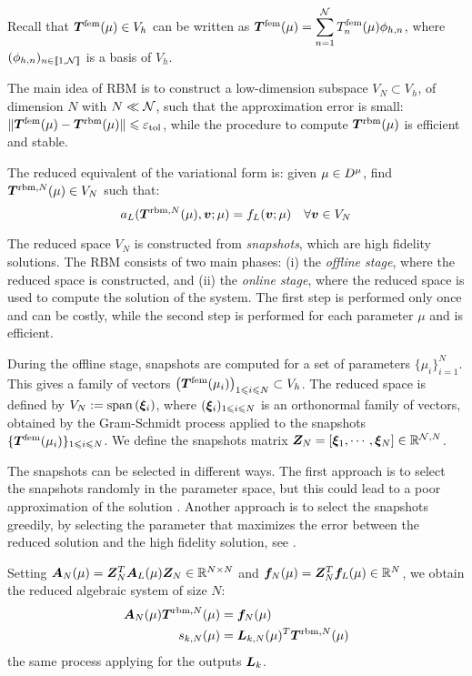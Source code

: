 Recall that $\vct{T}^\fem(\mu)\in V_h$ can be written as $\vct{T}^\fem(\mu)=\displaystyle\sum_{n=1}^\N T^\fem_n(\mu)\phi_{h,n}$, where $(\phi_{h,n})_{n\in\llbracket 1,\mathcal{N}\rrbracket}$ is a basis of $V_h$.

The main idea of RBM is to construct a low-dimension subspace $V_N\subset V_h$, of dimension $N$ with $N\ll \mathcal{N}$, such that the approximation error is small:
$\Vert \vct{T}^\fem(\mu) - \vct{T}^\rbm(\mu)\Vert \leqslant \varepsilon_\tol$, while the procedure to compute $\vct{T}^\rbm(\mu)$ is efficient and stable.

The reduced equivalent of the variational form  is:
given $\mu\in D^{\mu}$, find $\vct{T}^{\rbm, N}(\mu)\in V_N$ such that:
\begin{equation}
    a_L(\vct{T}^{\rbm, N}(\mu), \vct{v}; \mu) = f_L(\vct{v}; \mu) \quad \forall \vct{v}\in V_N
    \label{eq:pb-var-rbm-reduced}
\end{equation}


The reduced space $V_N$ is constructed from \emph{snapshots}, which are high fidelity solutions.
The RBM consists of two main phases:
(i) the \emph{offline stage}, where the reduced space is constructed, and
(ii) the \emph{online stage}, where the reduced space is used to compute the solution of the system.
The first step is performed only once and can be costly, while the second step is performed for each parameter $\mu$ and is efficient.

During the offline stage, snapshots are computed for a set of parameters $\{\mu_i\}_{i=1}^N$.
This gives a family of vectors $\big(\vct{T}^\fem(\mu_i)\big)_{1\leqslant i\leqslant N}\subset V_h$.
The reduced space is defined by $V_N := \text{span}\left(\vct{\xi}_i\right)$, where $(\vct{\xi}_i)_{1\leqslant i\leqslant N}$ is an orthonormal family of vectors, obtained by the Gram-Schmidt process applied to the snapshots $\{\vct{T}^\fem(\mu_i)\}_{1\leqslant i\leqslant N}$.
We define the snapshots matrix $\mat{Z}_N = \left[\vct{\xi}_1,\cdots,\vct{\xi}_N\right]\in \R^{\N,N}$.

The snapshots can be selected in different ways.
The first approach is to select the snapshots randomly in the parameter space, but this could lead to a poor approximation of the solution \cite{buffa2012}.
Another approach is to select the snapshots greedily, by selecting the parameter that maximizes the error between the reduced solution and the high fidelity solution, see .


Setting $\mat{A}_N(\mu) = \mat{Z}_N^T \mat{A}_L(\mu) \mat{Z}_N \in \R^{N\times N}$ and $\vct{f}_N(\mu) = \mat{Z}_N^T \vct{f}_L(\mu) \in \R^N$, we obtain the reduced algebraic system of size $N$:
\begin{subequations}
\begin{align}
    \mat{A}_N(\mu) \vct{T}^{\rbm,N}(\mu) &= \vct{f}_N(\mu)\label{eq:fe-syst-reduced:pb}\\
    s_{k,N}(\mu) &= \vct{L}_{k,N}(\mu)^T \vct{T}^{\rbm,N}(\mu)
\end{align}
\label{eq:fe-syst-reduced}
\end{subequations}
the same process applying for the outputs $\vct{L}_k$.




